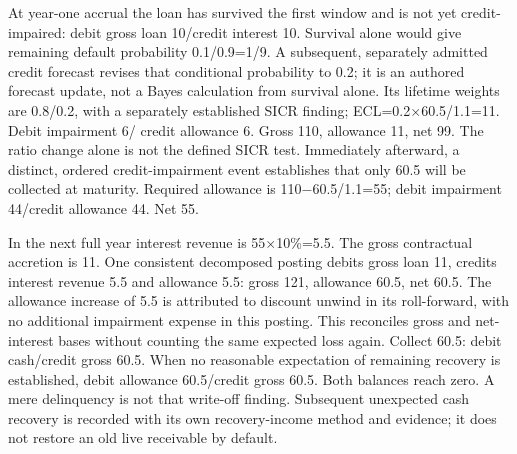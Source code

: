 At year-one accrual the loan has survived the first window and is not yet credit-impaired: debit gross loan 10/credit interest 10. Survival alone would give remaining default probability 0.1/0.9=1/9. A subsequent, separately admitted credit forecast revises that conditional probability to 0.2; it is an authored forecast update, not a Bayes calculation from survival alone. Its lifetime weights are 0.8/0.2, with a separately established SICR finding; ECL=0.2\ensuremath{\times}60.5/1.1=11. Debit impairment 6/ credit allowance 6. Gross 110, allowance 11, net 99. The ratio change alone is not the defined SICR test. Immediately afterward, a distinct, ordered credit-impairment event establishes that only 60.5 will be collected at maturity. Required allowance is 110\ensuremath{-}60.5/1.1=55; debit impairment 44/credit allowance 44. Net 55.

In the next full year interest revenue is 55\ensuremath{\times}10\%=5.5. The gross contractual accretion is 11. One consistent decomposed posting debits gross loan 11, credits interest revenue 5.5 and allowance 5.5: gross 121, allowance 60.5, net 60.5. The allowance increase of 5.5 is attributed to discount unwind in its roll-forward, with no additional impairment expense in this posting. This reconciles gross and net-interest bases without counting the same expected loss again. Collect 60.5: debit cash/credit gross 60.5. When no reasonable expectation of remaining recovery is established, debit allowance 60.5/credit gross 60.5. Both balances reach zero. A mere delinquency is not that write-off finding. Subsequent unexpected cash recovery is recorded with its own recovery-income method and evidence; it does not restore an old live receivable by default.


